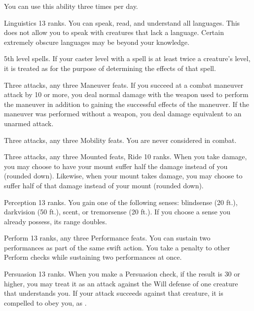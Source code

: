 You can use this ability three times per day.

\featpre Linguistics 13 ranks.
\featben You can speak, read, and understand all languages.
This does not allow you to speak with creatures that lack a language.
Certain extremely obscure languages may be beyond your knowledge.

\featpre 5th level spells.
\featben If your caster level with a spell is at least twice a creature's level, it is treated as \bloodied for the purpose of determining the effects of that spell.

\featpres Three attacks, any three Maneuver feats.
\featben If you succeed at a combat maneuver attack by 10 or more, you deal normal damage with the weapon used to perform the maneuver in addition to gaining the successful effects of the maneuver.
If the maneuver was performed without a weapon, you deal damage equivalent to an unarmed attack.

\featpres Three attacks, any three Mobility feats.
\featben You are never considered \engaged in combat.

\featpres Three attacks, any three Mounted feats, Ride 10 ranks.
\featben When you take damage, you may choose to have your mount suffer half the damage instead of you (rounded down).
Likewise, when your mount takes damage, you may choose to suffer half of that damage instead of your mount (rounded down).

\featpre Perception 13 ranks.
\featben You gain one of the following senses: blindsense (20 ft.), darkvision (50 ft.), scent, or tremorsense (20 ft.).
If you choose a sense you already possess, its range doubles.

\featpres Perform 13 ranks, any three Performance feats.
\featben You can sustain two performances as part of the same swift action.
You take a  penalty to other Perform checks while sustaining two performances at once.

\featpre Persuasion 13 ranks.
\featben When you make a Persuasion check, if the result is 30 or higher, you may treat it as an attack against the Will defense of one creature that understands you.
If your attack succeeds against that creature, it is compelled to obey you, as .

